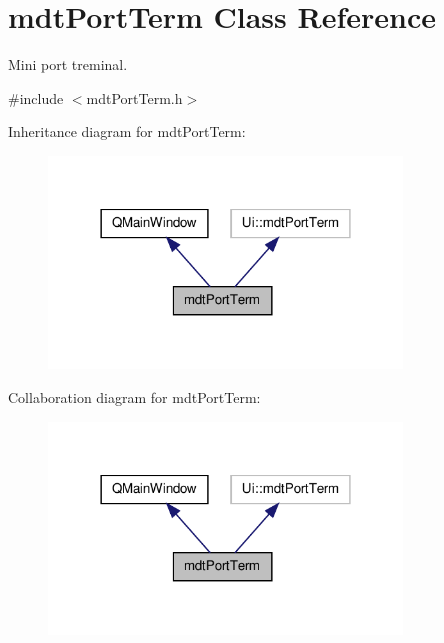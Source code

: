 \hypertarget{classmdt_port_term}{\section{mdt\-Port\-Term Class Reference}
\label{classmdt_port_term}
}


Mini port treminal.  




{\ttfamily \#include $<$mdt\-Port\-Term.\-h$>$}



Inheritance diagram for mdt\-Port\-Term\-:\nopagebreak
\begin{figure}[H]
\begin{center}
\leavevmode
\includegraphics[width=266pt]{classmdt_port_term__inherit__graph}
\end{center}
\end{figure}


Collaboration diagram for mdt\-Port\-Term\-:\nopagebreak
\begin{figure}[H]
\begin{center}
\leavevmode
\includegraphics[width=266pt]{classmdt_port_term__coll__graph}
\end{center}
\end{figure}
